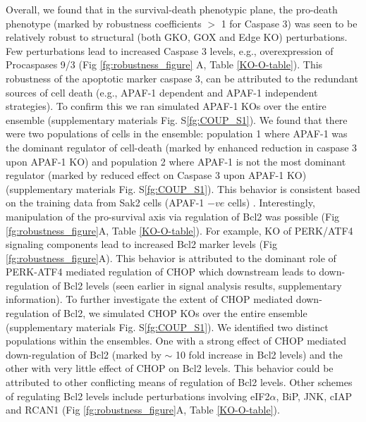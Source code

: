 \documentclass[12pt]{article}
\begin{document}
Overall, we found that in the survival-death phenotypic plane, the pro-death phenotype (marked by robustness coefficients $>$ 1 for Caspase 3) was seen to be relatively robust to structural (both GKO, GOX and Edge KO) perturbations. Few perturbations lead to increased Caspase 3 levels, e.g., overexpression of Procaspases 9/3 (Fig \ref{fg:robustness_figure} A, Table \ref{KO-O-table}). This robustness of the apoptotic marker caspase 3, can be attributed to the redundant sources of cell death (e.g., APAF-1 dependent and APAF-1 independent strategies). To confirm this we ran simulated APAF-1 KOs over the entire ensemble (supplementary materials Fig. S\ref{fg:COUP_S1}). We found that there were two populations of cells in the ensemble: population 1 where APAF-1 was the dominant regulator of cell-death (marked by enhanced reduction in caspase 3 upon APAF-1 KO) and population 2 where APAF-1 is not the most dominant regulator (marked by reduced effect on Caspase 3 upon APAF-1 KO) (supplementary materials Fig. S\ref{fg:COUP_S1}). This behavior is consistent based on the training data from Sak2 cells (APAF-1 $-ve$ cells) \cite{rao2002cer}. Interestingly, manipulation of the pro-survival axis via regulation of Bcl2 was possible (Fig \ref{fg:robustness_figure}A, Table \ref{KO-O-table}). For example, KO of PERK/ATF4 signaling components lead to increased Bcl2 marker levels (Fig \ref{fg:robustness_figure}A). This behavior is attributed to the dominant role of PERK-ATF4 mediated regulation of CHOP which downstream leads to down-regulation of Bcl2 levels (seen earlier in signal analysis results, supplementary information). To further investigate the extent of CHOP mediated down-regulation of Bcl2, we simulated CHOP KOs over the entire ensemble (supplementary materials Fig. S\ref{fg:COUP_S1}). We identified two distinct populations within the ensembles. One with a strong effect of CHOP mediated down-regulation of Bcl2 (marked by $\sim$ 10 fold increase in Bcl2 levels) and the other with very little effect of CHOP on Bcl2 levels. This behavior could be attributed to other conflicting means of regulation of Bcl2 levels. Other schemes of regulating Bcl2 levels include perturbations involving eIF2$\alpha$, BiP, JNK, cIAP and RCAN1 (Fig \ref{fg:robustness_figure}A, Table \ref{KO-O-table}). 
\end{document}

